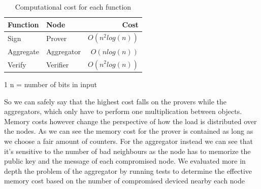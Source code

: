 \documentclass[10pt, a4paper, twocolumn]{article} %
\begin{document}
\begin{table}
	\caption{Computational cost for each function}
	\centering
	\begin{threeparttable}
	\begin{tabular}{llr}
		\toprule
		Function & Node & Cost \\
		\midrule
		Sign & Prover & $O(n^2log(n))$ \\
		Aggregate & Aggregator & $O(n log(n))$ \\
		Verify & Verifier & $O(n^2log(n))$ \\
		\bottomrule
	\end{tabular}
	\begin{tablenotes}
	\item[1] n = number of bits in input
	\end{tablenotes} 
\end{threeparttable}
\end{table}
So we can safely say that the highest cost falls on the provers while the aggregators, which only have to perform one multiplication between objects.
Memory costs however change the perspective of how the load is distributed over the nodes.
As we can see the memory cost for the prover is contained as long as we choose a fair amount of counters. For the aggregator instead we can see that it's sensitive to the number of bad neighbours as the node has to memorize the public key and the message of each compromised node.
We evaluated more in depth the problem of the aggregator by running tests to determine the effective memory cost based on the number of compromised deviced nearby each node
\end{document}
